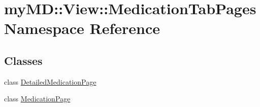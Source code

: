 \hypertarget{namespacemy_m_d_1_1_view_1_1_medication_tab_pages}{
\section{my\-MD::View::Medication\-Tab\-Pages Namespace Reference}
\label{df/d4f/namespacemy_m_d_1_1_view_1_1_medication_tab_pages}
}


\subsection*{Classes}
\begin{CompactItemize}
\item 
class \hyperlink{classmy_m_d_1_1_view_1_1_medication_tab_pages_1_1_detailed_medication_page}{Detailed\-Medication\-Page}
\item 
class \hyperlink{classmy_m_d_1_1_view_1_1_medication_tab_pages_1_1_medication_page}{Medication\-Page}
\end{CompactItemize}
